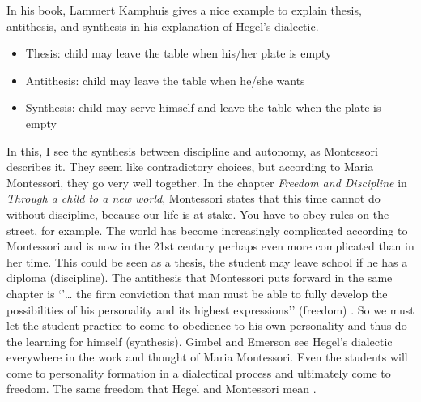 \documentclass[12pt, a4paper]{article}
\begin{document}
In his book, Lammert Kamphuis gives a nice example to explain thesis, antithesis, and synthesis in his explanation of Hegel’s dialectic. \cite[p.89]{Kamphuis2023}

\begin{itemize} 
    \item Thesis: child may leave the table when his/her plate is empty 
    \item Antithesis: child may leave the table when he/she wants 
    \item Synthesis: child may serve himself and leave the table when the plate is empty 
\end{itemize}

In this, I see the synthesis between discipline and autonomy, as Montessori describes it. They seem like contradictory choices, but according to Maria Montessori, they go very well together. In the chapter \emph{Freedom and Discipline} in \emph{Through a child to a new world}, Montessori states that this time cannot do without discipline, because our life is at stake. You have to obey rules on the street, for example. The world has become increasingly complicated according to Montessori and is now in the 21st century perhaps even more complicated than in her time. This could be seen as a thesis, the student may leave school if he has a diploma (discipline). The antithesis that Montessori puts forward in the same chapter is ‘’… the firm conviction that man must be able to fully develop the possibilities of his personality and its highest expressions’’ (freedom) \cite[p.82]{Montessori1954}. So we must let the student practice to come to obedience to his own personality and thus do the learning for himself (synthesis). Gimbel and Emerson see Hegel’s dialectic everywhere in the work and thought of Maria Montessori. Even the students will come to personality formation in a dialectical process and ultimately come to freedom. The same freedom that Hegel and Montessori mean \cite[]{Gimbel}.
\end{document}
